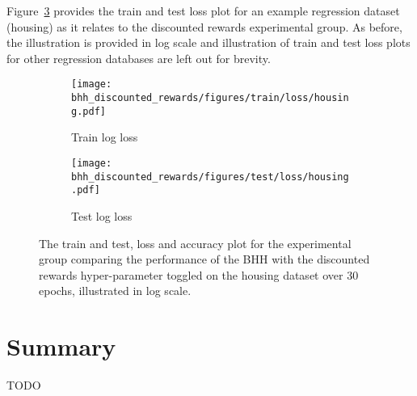 Figure~\ref{fig:results:discounted_rewards:figures:housing} provides the train and test loss plot for an example regression dataset (housing) as it relates to the discounted rewards experimental group. As before, the illustration is provided in log scale and illustration of train and test loss plots for other regression databases are left out for brevity.

\begin{figure}[htbp]
	\begin{subfigure}{0.5\textwidth}
		\centering
		\texttt{[image: bhh\_discounted\_rewards/figures/train/loss/housing.pdf]}
		\caption{Train log loss}
		\label{fig:results:discounted_rewards:figures:loss:train:housing}
	\end{subfigure}
	\begin{subfigure}{0.5\textwidth}
		\centering
		\texttt{[image: bhh\_discounted\_rewards/figures/test/loss/housing.pdf]}
		\caption{Test log loss}
		\label{fig:results:discounted_rewards:figures:loss:test:housing}
	\end{subfigure}
	\par\bigskip
	\caption{The train and test, loss and accuracy plot for the experimental group comparing the performance of the \acs{BHH} with the discounted rewards hyper-parameter toggled on the housing dataset over 30 epochs, illustrated in log scale.}
	\label{fig:results:discounted_rewards:figures:housing}
\end{figure}

\section{Summary}\label{sec:results:summary}

TODO